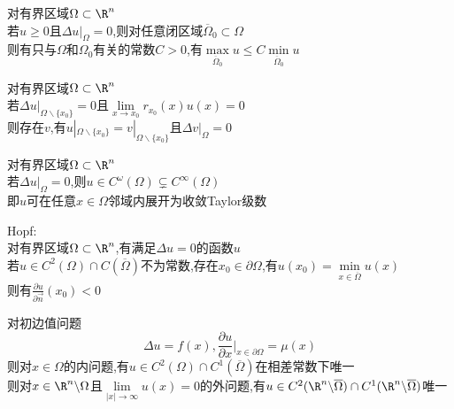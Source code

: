 \begin{dingli}
对有界区域$\Omega\subset \R^n$\\
若$u\geq 0$且$\Delta u|_{\Omega}=0$,则对任意闭区域$\overline{\Omega}_0\subset \Omega$\\
则有只与$\Omega$和$\Omega_0$有关的常数$C>0$,有$\max\limits_{\overline{\Omega}_0}u \leq C\min\limits_{\overline{\Omega}_{0}}u$
\end{dingli}

\begin{dingli}
对有界区域$\Omega\subset \R^n$\\
若$\Delta u|_{\Omega\backslash\{x_0\}}=0$且$\lim\limits_{x\to x_0}r_{x_0}(x)u(x)=0$\\
则存在$v$,有$u|_{\Omega\backslash\{x_0\}}=v|_{\Omega\backslash\{x_0\}}$且$\Delta v|_{\Omega}=0$
\end{dingli}

\begin{dingli}
对有界区域$\Omega\subset \R^n$\\
若$\Delta u|_{\Omega}=0$,则$u\in C^{\omega}(\Omega)\subsetneq C^{\infty}(\Omega)$\\
即$u$可在任意$x\in \Omega$邻域内展开为收敛Taylor级数
\end{dingli}

\begin{dingli}
Hopf:\\
对有界区域$\Omega\subset \R^n$,有满足$\Delta u=0$的函数$u$\\
若$u\in C^{2}(\Omega)\cap C(\overline{\Omega})$不为常数,存在$x_0\in\partial \Omega$,有$u(x_0)=\min\limits_{x\in\overline{\Omega}}u(x)$\\
则有$\frac{\partial u}{\partial\vec{n}}(x_0)<0$
\end{dingli}

\begin{dingli}
对初边值问题
\[\Delta u=f(x),\frac{\partial u}{\partial x}|_{x\in\partial\Omega}=\mu(x)\]
则对$x\in \Omega$的内问题,有$u\in C^{2}(\Omega)\cap C^{1}(\overline{\Omega})$在相差常数下唯一\\
则对$x\in \R^{n}\backslash\Omega$且$\lim\limits_{|x|\to\infty}u(x)=0$的外问题,有$u\in C^{2}(\R^{n}\backslash\overline{\Omega})\cap C^{1}(\R^{n}\backslash\overline{\Omega})$唯一
\end{dingli}

%